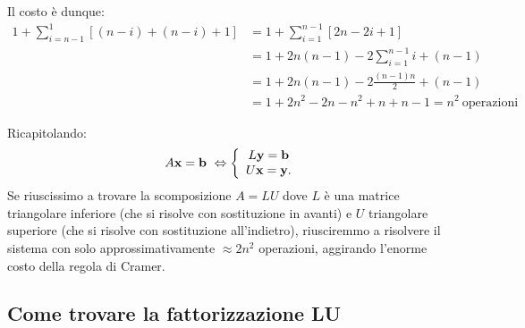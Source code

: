 Il costo è dunque:
\begin{align*}
  1+\sum ^{1}_{i=n-1}[( n-i) +( n-i) +1] &= 1+\sum ^{n-1}_{i=1}[ 2n-2i+1]\\
  &=1+2n( n-1) -2\sum ^{n-1}_{i=1} i+( n-1)\\
  &=1+2n( n-1) -2\frac{( n-1) n}{2} +( n-1)\\
  &=1+2n^{2} -2n-n^{2} +n+n-1=n^{2} \ \text{operazioni}
\end{align*}

Ricapitolando:
\begin{equation*}
A\x =\mathbf{b} \ \Leftrightarrow \left\{\begin{array}{ c }
L\y =\mathbf{b}\\
U\x =\y.
\end{array}\right.
\end{equation*}
Se riuscissimo a trovare la scomposizione $\displaystyle A=LU$ dove $\displaystyle L$ è una matrice triangolare inferiore (che si risolve con sostituzione in avanti) e $\displaystyle U$ triangolare superiore (che si risolve con sostituzione all'indietro), riusciremmo a risolvere il sistema con solo approssimativamente $\displaystyle \approx 2n^{2}$ operazioni, aggirando l'enorme costo della regola di Cramer.

\subsection{Come trovare la fattorizzazione LU}


